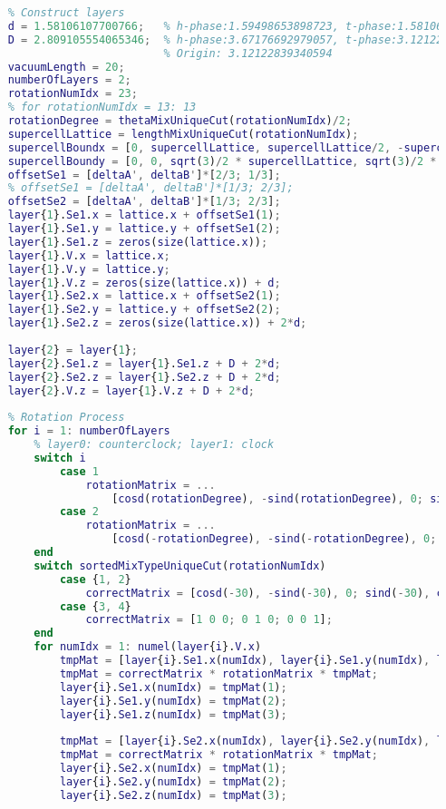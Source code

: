 \begin{lstlisting}[language=Matlab]
    %% Rotation
    % Construct layers
    d = 1.58106107700766;   % h-phase:1.59498653898723, t-phase:1.58106107700766
    D = 2.809105554065346;  % h-phase:3.67176692979057, t-phase:3.12122839340594
                            % Origin: 3.12122839340594
    vacuumLength = 20;
    numberOfLayers = 2;
    rotationNumIdx = 23;
    % for rotationNumIdx = 13: 13
    rotationDegree = thetaMixUniqueCut(rotationNumIdx)/2;
    supercellLattice = lengthMixUniqueCut(rotationNumIdx);
    supercellBoundx = [0, supercellLattice, supercellLattice/2, -supercellLattice/2, 0];
    supercellBoundy = [0, 0, sqrt(3)/2 * supercellLattice, sqrt(3)/2 * supercellLattice, 0];
    offsetSe1 = [deltaA', deltaB']*[2/3; 1/3];
    % offsetSe1 = [deltaA', deltaB']*[1/3; 2/3];
    offsetSe2 = [deltaA', deltaB']*[1/3; 2/3];
    layer{1}.Se1.x = lattice.x + offsetSe1(1);
    layer{1}.Se1.y = lattice.y + offsetSe1(2);
    layer{1}.Se1.z = zeros(size(lattice.x));
    layer{1}.V.x = lattice.x;
    layer{1}.V.y = lattice.y;
    layer{1}.V.z = zeros(size(lattice.x)) + d;
    layer{1}.Se2.x = lattice.x + offsetSe2(1);
    layer{1}.Se2.y = lattice.y + offsetSe2(2);
    layer{1}.Se2.z = zeros(size(lattice.x)) + 2*d;
    
    layer{2} = layer{1};
    layer{2}.Se1.z = layer{1}.Se1.z + D + 2*d;
    layer{2}.Se2.z = layer{1}.Se2.z + D + 2*d;
    layer{2}.V.z = layer{1}.V.z + D + 2*d;
    
    % Rotation Process
    for i = 1: numberOfLayers
        % layer0: counterclock; layer1: clock
        switch i
            case 1
                rotationMatrix = ...
                    [cosd(rotationDegree), -sind(rotationDegree), 0; sind(rotationDegree), cosd(rotationDegree), 0; 0 0 1];
            case 2
                rotationMatrix = ...
                    [cosd(-rotationDegree), -sind(-rotationDegree), 0; sind(-rotationDegree), cosd(-rotationDegree), 0; 0 0 1];
        end
        switch sortedMixTypeUniqueCut(rotationNumIdx)
            case {1, 2}
                correctMatrix = [cosd(-30), -sind(-30), 0; sind(-30), cosd(-30), 0; 0 0 1];
            case {3, 4}
                correctMatrix = [1 0 0; 0 1 0; 0 0 1];
        end
        for numIdx = 1: numel(layer{i}.V.x)
            tmpMat = [layer{i}.Se1.x(numIdx), layer{i}.Se1.y(numIdx), layer{i}.Se1.z(numIdx)]';
            tmpMat = correctMatrix * rotationMatrix * tmpMat;
            layer{i}.Se1.x(numIdx) = tmpMat(1);
            layer{i}.Se1.y(numIdx) = tmpMat(2);
            layer{i}.Se1.z(numIdx) = tmpMat(3);
            
            tmpMat = [layer{i}.Se2.x(numIdx), layer{i}.Se2.y(numIdx), layer{i}.Se2.z(numIdx)]';
            tmpMat = correctMatrix * rotationMatrix * tmpMat;
            layer{i}.Se2.x(numIdx) = tmpMat(1);
            layer{i}.Se2.y(numIdx) = tmpMat(2);
            layer{i}.Se2.z(numIdx) = tmpMat(3);
            

\end{lstlisting}
